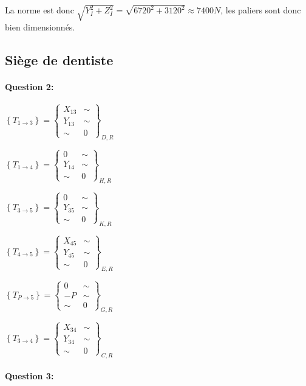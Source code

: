 La norme est donc $\sqrt{Y_I^2+Z_I^2}=\sqrt{6720^2+3120^2}\approx 7400N$, les paliers sont donc bien dimensionnés.

\subsection{Siège de dentiste}

\paragraph{Question 2:}

$\left\{T_{1\rightarrow 3}\right\}=\left\{
\begin{array}{cc}
X_{13} & \sim \\
Y_{13} & \sim \\
\sim & 0
\end{array}
\right\}_{D,R}$

$\left\{T_{1\rightarrow 4}\right\}=\left\{
\begin{array}{cc}
0 & \sim \\
Y_{14} & \sim \\
\sim & 0
\end{array}
\right\}_{H,R}$

$\left\{T_{3\rightarrow 5}\right\}=\left\{
\begin{array}{cc}
0 & \sim \\
Y_{35} & \sim \\
\sim & 0
\end{array}
\right\}_{K,R}$

$\left\{T_{4\rightarrow 5}\right\}=\left\{
\begin{array}{cc}
X_{45} & \sim \\
Y_{45} & \sim \\
\sim & 0
\end{array}
\right\}_{E,R}$

$\left\{T_{P\rightarrow 5}\right\}=\left\{
\begin{array}{cc}
0 & \sim \\
-P & \sim \\
\sim & 0
\end{array}
\right\}_{G,R}$

$\left\{T_{3\rightarrow 4}\right\}=\left\{
\begin{array}{cc}
X_{34} & \sim \\
Y_{34} & \sim \\
\sim & 0
\end{array}
\right\}_{C,R}$

\paragraph{Question 3:}


